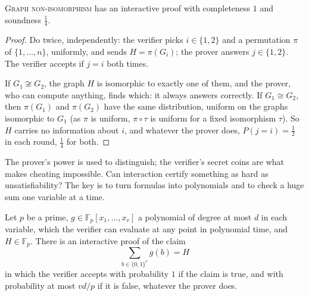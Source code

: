 \begin{proposition}\label{prop:gni}
\textup{\textsc{Graph non-isomorphism}} has an interactive proof with completeness $1$ and soundness $\frac14$.
\end{proposition}

\begin{proof}
Do twice, independently: the verifier picks $i\in\{1,2\}$ and a permutation $\pi$ of $\{1,\dots,n\}$, uniformly, and sends $H=\pi(G_i)$; the prover answers $j\in\{1,2\}$. The verifier accepts if $j=i$ both times.

If $G_1\not\cong G_2$, the graph $H$ is isomorphic to exactly one of them, and the prover, who can compute anything, finds which: it always answers correctly. If $G_1\cong G_2$, then $\pi(G_1)$ and $\pi(G_2)$ have the same distribution, uniform on the graphs isomorphic to $G_1$ (as $\pi$ is uniform, $\pi\circ\tau$ is uniform for a fixed isomorphism $\tau$). So $H$ carries no information about $i$, and whatever the prover does, $P(j=i)=\frac12$ in each round, $\frac14$ for both.
\end{proof}

The prover's power is used to distinguish; the verifier's secret coins are what makes cheating impossible. Can interaction certify something as hard as unsatisfiability? The key is to turn formulas into polynomials and to check a huge sum one variable at a time.

\begin{theorem}\label{thm:sumcheck}
Let $p$ be a prime, $g\in\mathbb F_p[x_1,\dots,x_v]$ a polynomial of degree at most $d$ in each variable, which the verifier can evaluate at any point in polynomial time, and $H\in\mathbb F_p$. There is an interactive proof of the claim
\[
\sum_{b\in\{0,1\}^v}g(b)=H
\]
in which the verifier accepts with probability $1$ if the claim is true, and with probability at most $vd/p$ if it is false, whatever the prover does.
\end{theorem}

